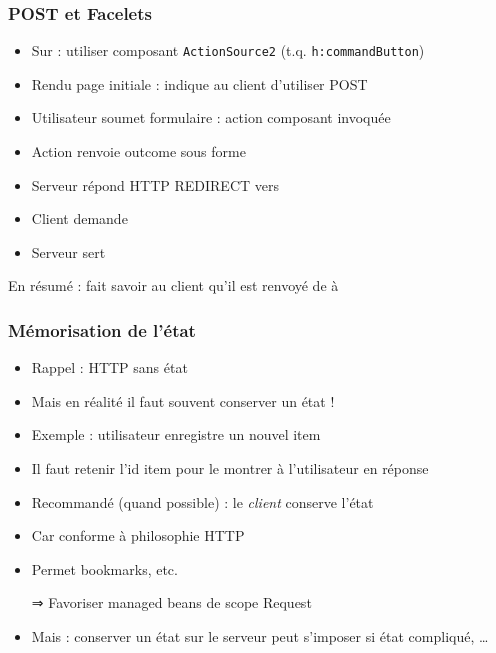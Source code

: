 \documentclass[english, french]{beamer}
\begin{document}
\begin{frame}
	\frametitle{POST et Facelets}
	\begin{itemize}
		\item Sur  : utiliser composant \texttt{ActionSource2} (t.q. \texttt{h:commandButton})
		\item Rendu page initiale : indique au client d’utiliser POST
		\item Utilisateur soumet formulaire : action composant invoquée
		\item Action renvoie outcome sous forme 
		\item Serveur répond HTTP REDIRECT vers 
		\item Client demande 
		\item Serveur sert 
	\end{itemize}
	En résumé : fait savoir au client qu’il est renvoyé de  à 
\end{frame}

\begin{frame}
	\frametitle{Mémorisation de l’état}
	\begin{itemize}
		\item Rappel : HTTP sans état
		\item Mais en réalité il faut souvent conserver un état !
		\item Exemple : utilisateur enregistre un nouvel item
		\item Il faut retenir l’id item pour le montrer à l’utilisateur en réponse
		\item Recommandé (quand possible) : le \emph{client} conserve l’état
		\item Car conforme à philosophie HTTP
		\item Permet bookmarks, etc.
		\item[⇒] Favoriser managed beans de scope Request
		\item Mais : conserver un état sur le serveur peut s’imposer si état compliqué, …
	\end{itemize}
\end{frame}
\end{document}

